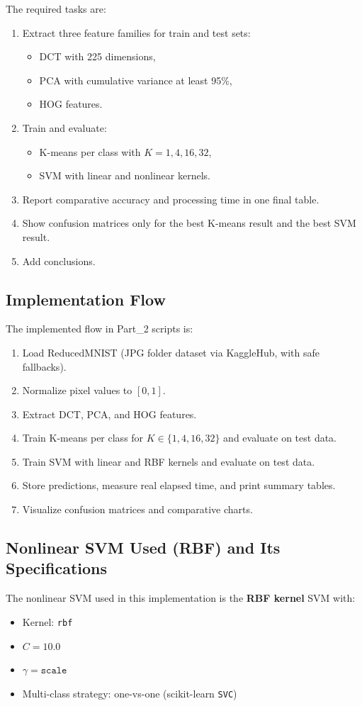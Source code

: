 \documentclass[12pt, a4paper]{article}
\begin{document}
The required tasks are:
\begin{enumerate}
    \item Extract three feature families for train and test sets:
    \begin{itemize}
        \item DCT with 225 dimensions,
        \item PCA with cumulative variance at least 95\%,
        \item HOG features.
    \end{itemize}
    \item Train and evaluate:
    \begin{itemize}
        \item K-means per class with \(K = 1, 4, 16, 32\),
        \item SVM with linear and nonlinear kernels.
    \end{itemize}
    \item Report comparative accuracy and processing time in one final table.
    \item Show confusion matrices only for the best K-means result and the best SVM result.
    \item Add conclusions.
\end{enumerate}

\subsection{Implementation Flow}
The implemented flow in Part\_2 scripts is:
\begin{enumerate}
    \item Load ReducedMNIST (JPG folder dataset via KaggleHub, with safe fallbacks).
    \item Normalize pixel values to \([0,1]\).
    \item Extract DCT, PCA, and HOG features.
    \item Train K-means per class for \(K \in \{1,4,16,32\}\) and evaluate on test data.
    \item Train SVM with linear and RBF kernels and evaluate on test data.
    \item Store predictions, measure real elapsed time, and print summary tables.
    \item Visualize confusion matrices and comparative charts.
\end{enumerate}

\subsection{Nonlinear SVM Used (RBF) and Its Specifications}
The nonlinear SVM used in this implementation is the \textbf{RBF kernel} SVM with:
\begin{itemize}
    \item Kernel: \texttt{rbf}
    \item \(C = 10.0\)
    \item \(\gamma = \texttt{scale}\)
    \item Multi-class strategy: one-vs-one (scikit-learn \texttt{SVC})
\end{itemize}
\end{document}
